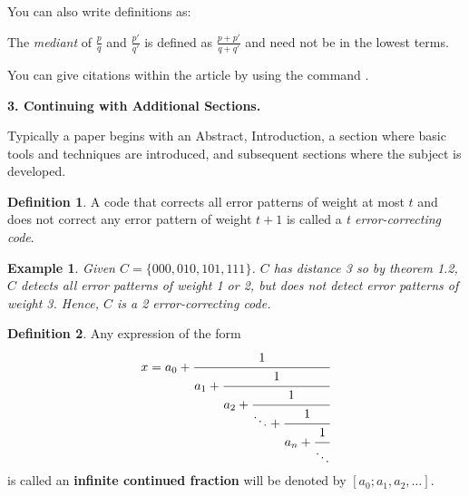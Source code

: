 \documentclass[11pt]{amsart}
\theoremstyle{plain}
\newtheorem{exa}{Example}
\theoremstyle{definition}
\newtheorem*{defi}{Definition}
\begin{document}
You can also write definitions as:

 The {\it mediant} of $\frac{p}{q}$ and $\frac{p'}{q'}$ is defined as $\frac{p+{p}'}{q+{q}'} $ and need not be in the lowest terms.
\medskip

You can give citations within the article by using the command \cite{Bonanno} \cite{Apostol} \cite{Barnsley} \cite{Davidson} \cite{Devaney}
\cite{Elaydi}.

\bigskip

\centerline{\bf 3. Continuing with Additional Sections.} 

Typically a paper begins with an Abstract, Introduction, a section where basic tools and techniques are introduced, and subsequent sections where the subject is developed.
\medskip

\begin{defi} A code that corrects all error patterns of weight at most $t$ and does not correct any error pattern of weight $t+1$ is called a {\it t error-correcting code}.
\end{defi}
\medskip

\begin{exa} Given $C=\{000, 010, 101, 111\}$. $C$ has distance 3 so by theorem 1.2, $C$ detects all error patterns of weight 1 or 2, but does not detect error patterns of weight 3. Hence, $C$ is a 2 error-correcting code.
\end{exa}

\medskip

\begin{defi}  Any expression of the form
$$x = a_{0} + \cfrac{1}{a_{1}+\cfrac{1}{a_{2}+\cfrac{1}{\ddots+\cfrac{1}{a_{n}+\cfrac{1}{\ddots}}}}}$$
is called an {\bf infinite continued fraction} will be denoted by $[a_0; a_1, a_2, \dots ] .$ 
\end{defi}
\medskip
\end{document}
